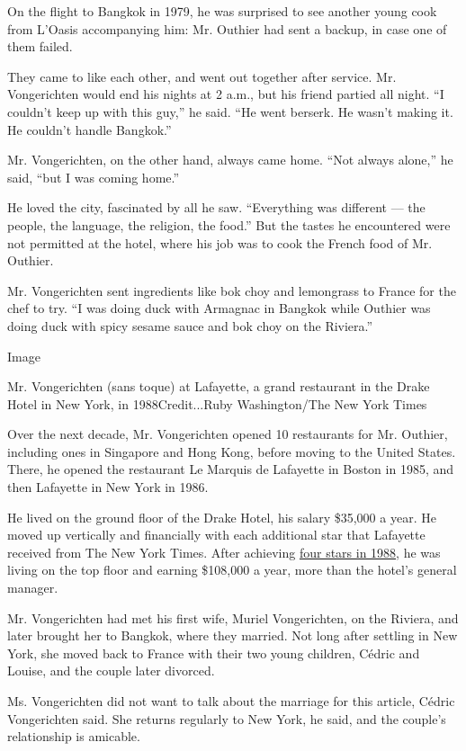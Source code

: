 On the flight to Bangkok in 1979, he was surprised to see another young
cook from L'Oasis accompanying him: Mr. Outhier had sent a backup, in
case one of them failed.

They came to like each other, and went out together after service. Mr.
Vongerichten would end his nights at 2 a.m., but his friend partied all
night. ``I couldn't keep up with this guy,'' he said. ``He went berserk.
He wasn't making it. He couldn't handle Bangkok.''

Mr. Vongerichten, on the other hand, always came home. ``Not always
alone,'' he said, ``but I was coming home.''

He loved the city, fascinated by all he saw. ``Everything was different
--- the people, the language, the religion, the food.'' But the tastes
he encountered were not permitted at the hotel, where his job was to
cook the French food of Mr. Outhier.

Mr. Vongerichten sent ingredients like bok choy and lemongrass to France
for the chef to try. ``I was doing duck with Armagnac in Bangkok while
Outhier was doing duck with spicy sesame sauce and bok choy on the
Riviera.''

Image

Mr. Vongerichten (sans toque) at Lafayette, a grand restaurant in the
Drake Hotel in New York, in 1988Credit...Ruby Washington/The New York
Times

Over the next decade, Mr. Vongerichten opened 10 restaurants for Mr.
Outhier, including ones in Singapore and Hong Kong, before moving to the
United States. There, he opened the restaurant Le Marquis de Lafayette
in Boston in 1985, and then Lafayette in New York in 1986.

He lived on the ground floor of the Drake Hotel, his salary \$35,000 a
year. He moved up vertically and financially with each additional star
that Lafayette received from The New York Times. After achieving
\href{https://www.nytimes.com/1988/04/22/arts/restaurants-067888.html}{four
stars in 1988}, he was living on the top floor and earning \$108,000 a
year, more than the hotel's general manager.

Mr. Vongerichten had met his first wife, Muriel Vongerichten, on the
Riviera, and later brought her to Bangkok, where they married. Not long
after settling in New York, she moved back to France with their two
young children, Cédric and Louise, and the couple later divorced.

Ms. Vongerichten did not want to talk about the marriage for this
article, Cédric Vongerichten said. She returns regularly to New York, he
said, and the couple's relationship is amicable.

